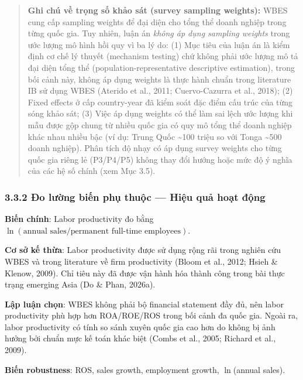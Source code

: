 \documentclass[12pt,a4paper]{article}
\begin{document}
\begin{quote}
\textbf{Ghi chú về trọng số khảo sát (survey sampling weights):} WBES
cung cấp sampling weights để đại diện cho tổng thể doanh nghiệp trong
từng quốc gia. Tuy nhiên, luận án \emph{không áp dụng sampling weights}
trong ước lượng mô hình hồi quy vì ba lý do: (1) Mục tiêu của luận án là
kiểm định cơ chế lý thuyết (mechanism testing) chứ không phải ước lượng
mô tả đại diện tổng thể (population-representative descriptive
estimation), trong bối cảnh này, không áp dụng weights là thực hành
chuẩn trong literature IB sử dụng WBES (Aterido et al., 2011;
Cuervo-Cazurra et al., 2018); (2) Fixed effects ở cấp country-year đã
kiểm soát đặc điểm cấu trúc của từng sóng khảo sát; (3) Việc áp dụng
weights có thể làm sai lệch ước lượng khi mẫu được gộp chung từ nhiều
quốc gia có quy mô tổng thể doanh nghiệp khác nhau nhiều bậc (ví dụ:
Trung Quốc \textasciitilde100 triệu so với Tonga \textasciitilde500
doanh nghiệp). Phân tích độ nhạy có áp dụng survey weights cho từng quốc
gia riêng lẻ (P3/P4/P5) không thay đổi hướng hoặc mức độ ý nghĩa của các
hệ số chính (xem Mục 3.5).
\end{quote}

\hypertarget{332-ux111o-lux1b0ux1eddng-biux1ebfn-phux1ee5-thuux1ed9c--hiux1ec7u-quux1ea3-houx1ea1t-ux111ux1ed9ng}{%
\subsubsection{3.3.2 Đo lường biến phụ thuộc --- Hiệu quả hoạt
động}\label{332-ux111o-lux1b0ux1eddng-biux1ebfn-phux1ee5-thuux1ed9c--hiux1ec7u-quux1ea3-houx1ea1t-ux111ux1ed9ng}}

\textbf{Biến chính}: Labor productivity đo bằng
\(\ln(\text{annual sales} / \text{permanent full-time employees})\).

\textbf{Cơ sở kế thừa}: Labor productivity được sử dụng rộng rãi trong
nghiên cứu WBES và trong literature về firm productivity (Bloom et al.,
2012; Hsieh \& Klenow, 2009). Chỉ tiêu này đã được vận hành hóa thành
công trong bài thực trạng emerging Asia (Do \& Phan, 2026a).

\textbf{Lập luận chọn}: WBES không phải bộ financial statement đầy đủ,
nên labor productivity phù hợp hơn ROA/ROE/ROS trong bối cảnh đa quốc
gia. Ngoài ra, labor productivity có tính so sánh xuyên quốc gia cao hơn
do không bị ảnh hưởng bởi chuẩn mực kế toán khác biệt (Combs et al.,
2005; Richard et al., 2009).

\textbf{Biến robustness}: ROS, sales growth, employment growth,
\(\ln\)(annual sales).
\end{document}
